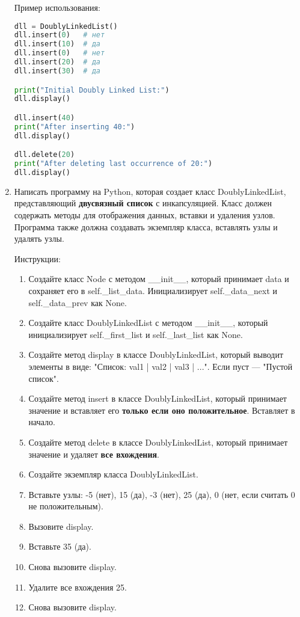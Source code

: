 \begin{enumerate}
Пример использования:
\begin{lstlisting}[language=Python]
dll = DoublyLinkedList()
dll.insert(0)   # нет
dll.insert(10)  # да
dll.insert(0)   # нет
dll.insert(20)  # да
dll.insert(30)  # да

print("Initial Doubly Linked List:")
dll.display()

dll.insert(40)
print("After inserting 40:")
dll.display()

dll.delete(20)
print("After deleting last occurrence of 20:")
dll.display()
\end{lstlisting}

\item Написать программу на Python, которая создает класс DoublyLinkedList, представляющий \textbf{двусвязный список} с инкапсуляцией. Класс должен содержать методы для отображения данных, вставки и удаления узлов. Программа также должна создавать экземпляр класса, вставлять узлы и удалять узлы.

Инструкции:
\begin{enumerate}
    \item Создайте класс Node с методом \_\_init\_\_, который принимает data и сохраняет его в self.\_list\_data. Инициализирует self.\_data\_next и self.\_data\_prev как None.
    \item Создайте класс DoublyLinkedList с методом \_\_init\_\_, который инициализирует self.\_first\_list и self.\_last\_list как None.
    \item Создайте метод display в классе DoublyLinkedList, который выводит элементы в виде: "Список: val1 | val2 | val3 | ...". Если пуст — "Пустой список".
    \item Создайте метод insert в классе DoublyLinkedList, который принимает значение и вставляет его \textbf{только если оно положительное}. Вставляет в начало.
    \item Создайте метод delete в классе DoublyLinkedList, который принимает значение и удаляет \textbf{все вхождения}.
    \item Создайте экземпляр класса DoublyLinkedList.
    \item Вставьте узлы: -5 (нет), 15 (да), -3 (нет), 25 (да), 0 (нет, если считать 0 не положительным).
    \item Вызовите display.
    \item Вставьте 35 (да).
    \item Снова вызовите display.
    \item Удалите все вхождения 25.
    \item Снова вызовите display.
\end{enumerate}


\end{enumerate}
